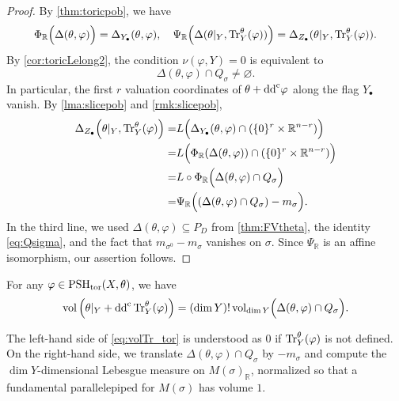 \begin{proof}
    By \cref{thm:toricpob}, we have
    \[
    \Phi_{\mathbb{R}} \Bigl( \Delta(\theta,\varphi) \Bigr)= \Delta_{Y_{\bullet}}(\theta,\varphi),\quad \Psi_{\mathbb{R}} \Bigl( \Delta(\theta|_Y,\operatorname{Tr}_{Y}^{\theta}(\varphi)) \Bigr)= \Delta_{Z_{\bullet}}(\theta|_Y,\operatorname{Tr}_{Y}^{\theta}(\varphi)).
    \]
    By \cref{cor:toricLelong2}, the condition $\nu(\varphi,Y)=0$ is equivalent to
    \[
        \Delta(\theta,\varphi)\cap Q_\sigma\neq\varnothing.
    \]
    In particular, the first $r$ valuation coordinates of $\theta+\mathrm{dd}^{\mathrm{c}}\varphi$ along the flag $Y_\bullet$ vanish.
    By \cref{lma:slicepob} and \cref{rmk:slicepob},
    \[
    \begin{aligned}
    \Delta_{Z_{\bullet}}\Bigl(\theta|_Y,\operatorname{Tr}_{Y}^{\theta}(\varphi)\Bigr)=& L \Bigl(  \Delta_{Y_{\bullet}}(\theta,\varphi) \cap (\{0\}^r \times \mathbb{R}^{n-r})\Bigr)\\
    =& L\Bigl( \Phi_{\mathbb{R}}(\Delta(\theta,\varphi)) \cap (\{0\}^r \times \mathbb{R}^{n-r}) \Bigr)\\
    =& L\circ \Phi_{\mathbb{R}} \Bigl(\Delta(\theta,\varphi)\cap Q_{\sigma} \Bigr)\\
    =& \Psi_{\mathbb{R}}\Bigl((\Delta(\theta,\varphi)\cap Q_{\sigma})-m_{\sigma}\Bigr).
    \end{aligned}
    \]
    In the third line, we used $\Delta(\theta,\varphi)\subseteq P_D$ from \cref{thm:FVtheta}, the identity \eqref{eq:Qsigma}, and the fact that $m_{\sigma^0}-m_\sigma$ vanishes on $\sigma$.
    Since $\Psi_{\mathbb{R}}$ is an affine isomorphism, our assertion follows.
\end{proof}

\begin{corollary}\label{cor:tor_tr_vol}
    For any $\varphi\in \mathrm{PSH}_{\mathrm{tor}}(X,\theta)$, we have
    \begin{equation}\label{eq:volTr_tor}
    \operatorname{vol} \left(\theta|_Y+\mathrm{dd}^{\mathrm{c}} \operatorname{Tr}_Y^{\theta}(\varphi)\right)=(\dim Y)!\operatorname{vol}_{\dim Y} \Bigl(\Delta(\theta,\varphi)\cap Q_{\sigma}\Bigr).
    \end{equation}
\end{corollary}
The left-hand side of \eqref{eq:volTr_tor} is understood as $0$ if $\operatorname{Tr}_Y^{\theta}(\varphi)$ is not defined. On the right-hand side, we translate $\Delta(\theta,\varphi)\cap Q_{\sigma}$ by $-m_{\sigma}$ and compute the $\dim Y$-dimensional Lebesgue measure on $M(\sigma)_{\mathbb{R}}$, normalized so that a fundamental parallelepiped for $M(\sigma)$ has volume $1$.

